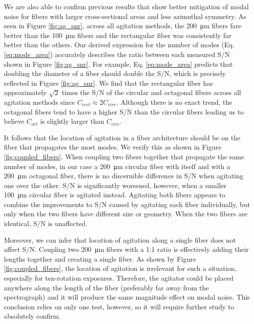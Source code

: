 \documentclass[twocolumn]{emulateapj}
\begin{document}
We are also able to confirm previous results that show better mitigation of modal noise for fibers with larger cross-sectional areas and less azimuthal symmetry. As seen in Figure \ref{fig:ag_snr}, across all agitation methods, the \SI{200}{\micro\meter} fibers fare better than the \SI{100}{\micro\meter} fibers and the rectangular fiber was consistently far better than the others. Our derived expression for the number of modes (Eq. \ref{eq:mode_area}) accurately describes the ratio between each measured S/N shown in Figure \ref{fig:ag_snr}. For example, Eq. \ref{eq:mode_area} predicts that doubling the diameter of a fiber should double the S/N, which is precisely reflected in Figure \ref{fig:ag_snr}. We find that the rectangular fiber has approximately $\sqrt{2}$ times the S/N of the circular and octagonal fibers across all agitation methods since $C_{rect} \approx 2C_{circ}$. Although there is no exact trend, the octagonal fibers tend to have a higher S/N than the circular fibers leading us to believe $C_{oct}$ is slightly larger than $C_{circ}$.

It follows that the location of agitation in a fiber architecture should be on the fiber that propagates the most modes. We verify this as shown in Figure \ref{fig:coupled_fibers}. When coupling two fibers together that propagate the same number of modes, in our case a \SI{200}{\micro\meter} circular fiber with itself and with a \SI{200}{\micro\meter} octagonal fiber, there is no discernible difference in S/N when agitating one over the other. S/N is significantly worsened, however, when a smaller \SI{100}{\micro\meter} circular fiber is agitated instead. Agitating both fibers appears to combine the improvements to S/N caused by agitating each fiber individually, but only when the two fibers have different size or geometry. When the two fibers are identical, S/N is unaffected.

Moreover, we can infer that location of agitation along a single fiber does not affect S/N. Coupling two \SI{200}{\micro\meter} fibers with a 1:1 ratio is effectively adding their lengths together and creating a single fiber. As shown by Figure \ref{fig:coupled_fibers}, the location of agitation is irrelevant for such a situation, especially for ten-rotation exposures. Therefore, the agitator could be placed anywhere along the length of the fiber (preferably far away from the spectrograph) and it will produce the same magnitude effect on modal noise. This conclusion relies on only one test, however, so it will require further study to absolutely confirm.
\end{document}
